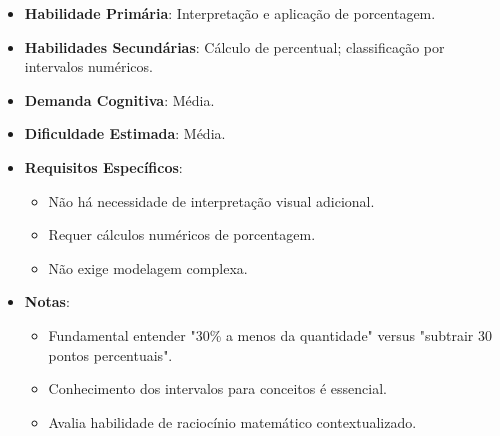 \documentclass{article}
\begin{document}
\begin{itemize}
  \item \textbf{Habilidade Primária}: Interpretação e aplicação de porcentagem.
  \item \textbf{Habilidades Secundárias}: Cálculo de percentual; classificação por intervalos numéricos.
  \item \textbf{Demanda Cognitiva}: Média.
  \item \textbf{Dificuldade Estimada}: Média.
  \item \textbf{Requisitos Específicos}:
  \begin{itemize}
    \item Não há necessidade de interpretação visual adicional.
    \item Requer cálculos numéricos de porcentagem.
    \item Não exige modelagem complexa.
  \end{itemize}
  \item \textbf{Notas}: 
  \begin{itemize}
    \item Fundamental entender "30\% a menos da quantidade" versus "subtrair 30 pontos percentuais".
    \item Conhecimento dos intervalos para conceitos é essencial.
    \item Avalia habilidade de raciocínio matemático contextualizado.
  \end{itemize}
\end{itemize}
\end{document}
